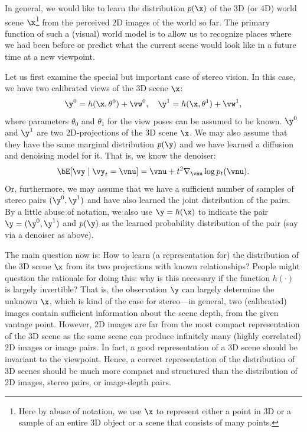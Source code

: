 \documentclass[../../book-main_zh.tex]{subfiles}
\begin{document}
In general, we would like to learn the distribution $p(\x)$ of the 3D
(or 4D) world scene $\x$\footnote{Here by abuse of notation, we use
    $\x$ to represent either a point in 3D or a sample of an entire 3D
object or a scene that consists of many points.} from the perceived
2D images of the world so far. The primary function of such a
(visual) world model is to allow us to recognize places where we had
been before or predict what the current scene would look like in a
future time at a new viewpoint.

Let us first examine the special but important case of stereo vision.
In this case, we have two calibrated views of the 3D scene $\x$:
\begin{equation}
    \y^0 = h(\x, \theta^0) +\vw^0, \quad \y^1 = h(\x, \theta^1) +\vw^1,
\end{equation}
where parameters $\theta_0$ and $\theta_1$ for the view poses can be
assumed to be known. $\y^0$ and $\y^1$ are two 2D-projections of the
3D scene $\x$. We may also assume that they have the same marginal
distribution $p(\y)$ and we have learned a diffusion and denoising
model for it. That is, we know the denoiser:
\begin{equation}
    \bE[\vy \mid \vy_t=\vnu] =
    \vnu + t^2 \nabla_{\vnu}\log p_t(\vnu).
    \label{eq:y-posterior-sampling-denoiser}
\end{equation}
Or, furthermore, we may assume that we have a sufficient number of
samples of stereo pairs $(\y^0, \y^1)$ and have also learned the
joint distribution of the pairs. By a little abuse of notation, we
also use $\y = h(\x)$ to indicate the pair $\y = (\y^0, \y^1)$ and
$p(\y)$ as the learned probability distribution of the pair (say via
a denoiser as above).

The main question now is: How to learn (a representation for) the
distribution of the 3D scene $\x$ from its two projections with known
relationships?
People might question the rationale for doing this: why is this
necessary if the function $h(\cdot)$ is largely invertible? That is,
the observation $\y$ can largely determine the unknown $\x$, which is
kind of the case for stereo—in general, two (calibrated) images
contain sufficient information about the scene depth, from the given
vantage point. However, 2D images are far from the most compact
representation of the 3D scene as the same scene can produce
infinitely many (highly correlated) 2D images or image pairs. In
fact, a good representation of a 3D scene should be invariant to the
viewpoint. Hence, a correct representation of the distribution of 3D
scenes should be much more compact and structured than the
distribution of 2D images, stereo pairs, or image-depth pairs.
\end{document}
